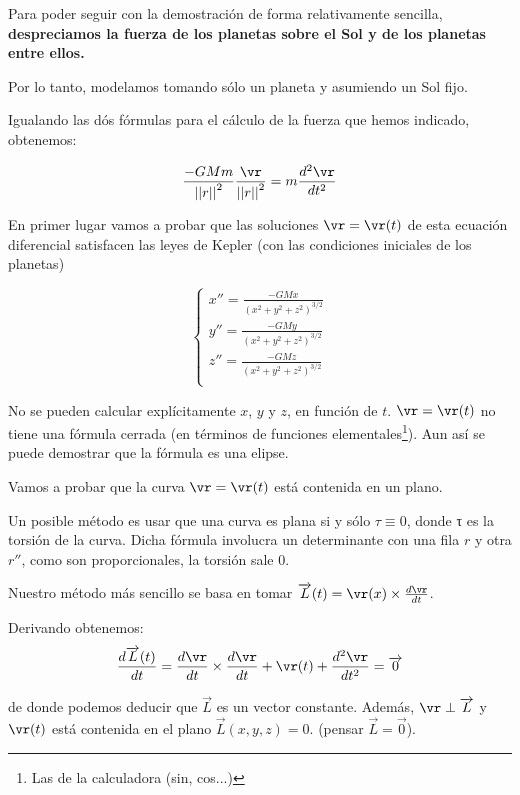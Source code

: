 Para poder seguir con la demostración de forma relativamente sencilla, \textbf{despreciamos la fuerza de los planetas sobre el Sol y de los planetas entre ellos.}

Por lo tanto, modelamos tomando sólo un planeta y asumiendo un Sol fijo.

Igualando las dós fórmulas para el cálculo de la fuerza que hemos indicado, obtenemos:

$$ \frac{-GMm}{{||r||}^2} \frac{\vr}{{||r||}^2}  =  m \frac{d^2\vr}{d t^2}$$


En primer lugar vamos a probar que las soluciones $\vr = \vr(t)$ de esta ecuación diferencial satisfacen las leyes de Kepler (con las condiciones iniciales de los planetas)

$$
\begin{cases}
 x'' = \frac{-GMx}{(x^2 + y^2 + z^2)^{3/2}}\\
 y'' = \frac{-GMy}{(x^2 + y^2 + z^2)^{3/2}}\\
 z'' = \frac{-GMz}{(x^2 + y^2 + z^2)^{3/2}}\\
\end{cases}
$$


 \begin{obs}
 No se pueden calcular explícitamente $x$, $y$ y $z$, en función de $t$. $\vr = \vr(t)$ no tiene una fórmula cerrada (en términos de funciones elementales\footnote{Las de la calculadora (sin, cos...)}). Aun así se puede demostrar que la fórmula es una elipse.
 \end{obs}


Vamos a probar que la curva $\vr = \vr(t)$ está contenida en un plano.

Un posible método es usar que una curva es plana si y sólo $τ \equiv 0$, donde τ es la torsión de la curva. Dicha fórmula involucra un determinante con una fila $r$ y otra $r''$, como son proporcionales, la torsión sale 0.


Nuestro método más sencillo se basa en tomar $\overrightarrow{L}(t) = \vr(x) \times \frac{d\vr}{dt}$.

Derivando obtenemos:
$$\frac{d\overrightarrow{L}(t)}{dt} = \frac{d\vr}{dt} \times \frac{d\vr}{dt} + \vr(t) + \frac{d^2\vr}{dt^2} = \overrightarrow{0}$$

de donde podemos deducir que $\overrightarrow{L}$ es un vector constante. Además, $\vr \perp \overrightarrow{L}$ y $ \vr(t)$ está contenida en el plano $\overrightarrow{L}(x,y,z) = 0 $.
(pensar $\overrightarrow{L} = \overrightarrow{0}$).

